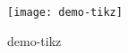 \documentclass{article}
\begin{document}
\begin{figure}
\centering
\texttt{[image: demo-tikz]}
\caption{demo-tikz}
\end{figure}
\end{document}
